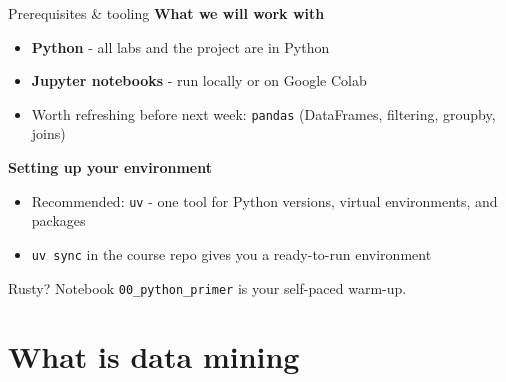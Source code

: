 \documentclass[10pt,aspectratio=169]{beamer}
\begin{document}
\begin{frame}{Prerequisites \& tooling}
  \textbf{What we will work with}
  \begin{itemize}\small
    \item \textbf{Python} - all labs and the project are in Python
    \item \textbf{Jupyter notebooks} - run locally or on Google Colab
    \item Worth refreshing before next week: \alert{\texttt{pandas}}
          (DataFrames, filtering, groupby, joins)
  \end{itemize}
  \vspace{0.5em}
  \textbf{Setting up your environment}
  \begin{itemize}\small
    \item Recommended: \texttt{uv} - one tool for Python versions,
          virtual environments, and packages
    \item \texttt{uv sync} in the course repo gives you a ready-to-run environment
  \end{itemize}
  \vspace{0.5em}
  \begin{alertblock}{Rusty?}
    Notebook \texttt{00\_python\_primer} is your self-paced warm-up.
  \end{alertblock}
\end{frame}

\section{What is data mining}
\end{document}
